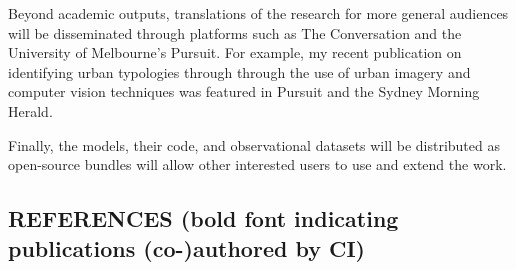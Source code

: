 Beyond academic outputs, translations of the research for more general audiences will be disseminated through platforms such as The Conversation and the University of Melbourne's Pursuit. For example, my recent publication on identifying urban typologies through through the use of urban imagery and computer vision techniques was featured in Pursuit\textbf{\cite{Nice2020c}} and the Sydney Morning Herald\cite{Gladstone2018a}. 

Finally, the models, their code, and observational datasets will be distributed as open-source bundles will allow other interested users to use and extend the work.




\subsection*{\TitleFont REFERENCES (bold font indicating publications (co-)authored by CI)}
\renewcommand{\refname}{\normalfont\selectfont\TitleFont REFERENCES} 
\begingroup
\fontsize{10pt}{10pt}\selectfont













%
